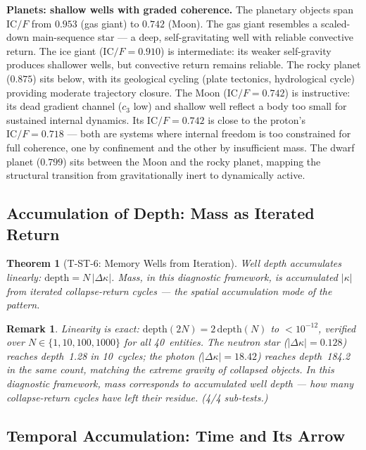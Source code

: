 \documentclass[
  aps,
  prd,
  twocolumn,
  superscriptaddress,
  nofootinbib,
  floatfix
]{revtex4-2}
\newtheorem{theorem}{Theorem}
\newtheorem{remark}{Remark}
\newcommand{\IC}{\mathrm{IC}}
\begin{document}
\textbf{Planets: shallow wells with graded coherence.}
The planetary objects span $\IC/F$ from $0.953$ (gas giant)
to $0.742$ (Moon).  The gas giant resembles a scaled-down
main-sequence star --- a deep, self-gravitating well with
reliable convective return.  The ice giant ($\IC/F = 0.910$)
is intermediate: its weaker self-gravity produces shallower
wells, but convective return remains reliable.
The rocky planet ($0.875$)
sits below, with its geological cycling (plate tectonics,
hydrological cycle) providing moderate trajectory closure.
The Moon ($\IC/F = 0.742$) is instructive: its dead
gradient channel ($c_3$ low) and shallow well reflect a
body too small for sustained internal dynamics.  Its
$\IC/F = 0.742$ is close to the proton's
$\IC/F = 0.718$ --- both are systems where internal freedom
is too constrained for full coherence, one by confinement
and the other by insufficient mass.  The dwarf planet
($0.799$) sits between the Moon and the rocky planet,
mapping the structural transition from gravitationally
inert to dynamically active.

\subsection{Accumulation of Depth: Mass as Iterated Return}

\begin{theorem}[T-ST-6: Memory Wells from Iteration]
\label{thm:T6}
Well depth accumulates linearly:
$\mathrm{depth} = N\,|\Delta\kappa|$.
Mass, in this diagnostic framework, is accumulated $|\kappa|$
from iterated collapse-return cycles --- the spatial
accumulation mode of the pattern.
\end{theorem}

\begin{remark}
Linearity is exact: $\mathrm{depth}(2N) = 2\,\mathrm{depth}(N)$
to $< 10^{-12}$, verified over $N \in \{1, 10, 100, 1000\}$
for all 40~entities.  The neutron star ($|\Delta\kappa| = 0.128$)
reaches depth~1.28 in 10~cycles; the photon ($|\Delta\kappa| =
18.42$) reaches depth~184.2 in the same count, matching the
extreme gravity of collapsed objects.  In this diagnostic
framework, mass corresponds to accumulated well depth ---
how many collapse-return cycles have left their
residue.  (4/4 sub-tests.)
\end{remark}


\subsection{Temporal Accumulation: Time and Its Arrow}\label{sec:time}
\end{document}
